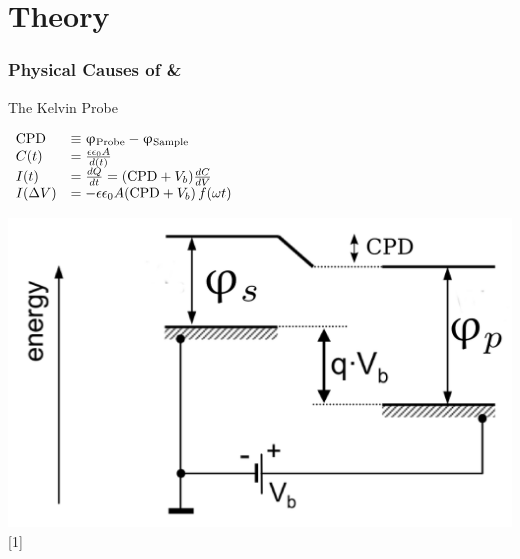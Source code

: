 \documentclass{beamer}
\begin{document}
\section{Theory}
\begin{frame}
\frametitle{Physical Causes of \cpd{} \& \spv{}}
\begin{block}{The Kelvin Probe}
\begin{minipage}{0.55\linewidth}
	$\begin{array}{l l}
		\text{CPD}{} &\equiv \upvarphi _{\text{Probe}} - \upvarphi _{\text{Sample}} \\
		C(t) &= \frac{\epsilon \epsilon_0 A}{d(t)} \\
		I(t) &= \frac{dQ}{dt}= (\text{CPD}{}+V_b) \frac{dC}{dV} \\
		I(\Delta V) &= -\epsilon \epsilon _0 A (\text{CPD}{}+V_b) \, f(\omega t)
	\end{array}$
\end{minipage}
\hfill
\begin{minipage}{0.4\linewidth}
\centering
	\includegraphics[width=1\linewidth]{./figs/pres/kp-scheme}\\
	\textcolor{RUred}{[1]}
\end{minipage}
\end{block}\end{frame}
\end{document}
